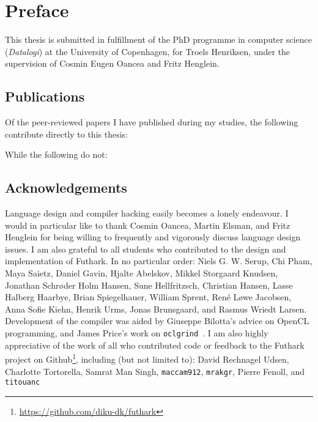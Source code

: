 {}
\chapter*{Preface}

This thesis is submitted in fulfillment of the PhD programme in
computer science (\textit{Datalogi}) at the University of Copenhagen,
for Troels Henriksen, under the supervision of Cosmin Eugen Oancea and
Fritz Henglein.

\section{Publications}

Of the peer-reviewed papers I have published during my studies, the
following contribute directly to this thesis:

\begin{quote}
\end{quote}
\begin{quote}
\end{quote}
\begin{quote}
\end{quote}

\noindent While the following do not:

\begin{quote}
\end{quote}
\begin{quote}
\end{quote}
\begin{quote}
\end{quote}

\section{Acknowledgements}

Language design and compiler hacking easily becomes a lonely
endeavour.  I would in particular like to thank Cosmin Oancea, Martin
Elsman, and Fritz Henglein for being willing to frequently and
vigorously discuss language design issues.  I am also grateful to all
students who contributed to the design and implementation of Futhark.
In no particular order: Niels G. W. Serup, Chi Pham, Maya Saietz,
Daniel Gavin, Hjalte Abelskov, Mikkel Storgaard Knudsen, Jonathan
Schrøder Holm Hansen, Sune Hellfritzsch, Christian Hansen, Lasse
Halberg Haarbye, Brian Spiegelhauer, William Sprent, René Løwe
Jacobsen, Anna Sofie Kiehn, Henrik Urms, Jonas Brunsgaard, and Rasmus
Wriedt Larsen.  Development of the compiler was aided by Giuseppe
Bilotta's advice on OpenCL programming, and James Price's work on
\texttt{oclgrind}~\cite{price2015oclgrind}.  I am also highly
appreciative of the work of all who contributed code or feedback to
the Futhark project on
Github\footnote{\url{https://github.com/diku-dk/futhark}}, including
(but not limited to): David Rechnagel Udsen, Charlotte Tortorella,
Samrat Man Singh, \texttt{maccam912}, \texttt{mrakgr}, Pierre Fenoll,
and \texttt{titouanc}

